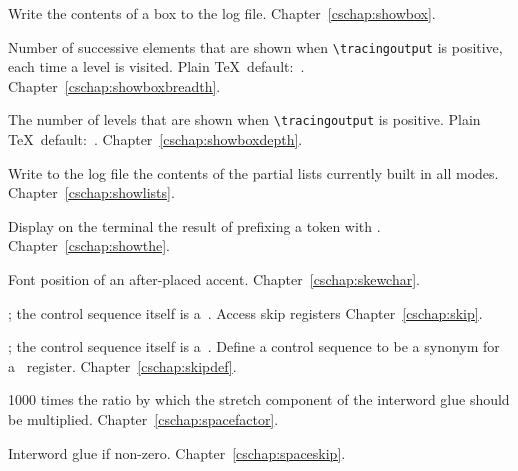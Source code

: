 \begin{glossinventory}
\item [\cs{showbox\gr{8-bit number}}]
      Write the contents of a box to the log file.
Chapter~\ref{cschap:showbox}.

\item [\cs{showboxbreadth}]
      Number of successive elements that are shown when 
      \verb-\tracingoutput- is positive, each time a level is visited.
      Plain \TeX\ default:~.
Chapter~\ref{cschap:showboxbreadth}.

\item [\cs{showboxdepth}] 
      The number of levels that are shown when 
      \verb-\tracingoutput- is positive.
      Plain \TeX\ default:~.
Chapter~\ref{cschap:showboxdepth}.

\item [\cs{showlists}]
      Write to the log file the contents of the partial lists 
      currently built in all modes.
Chapter~\ref{cschap:showlists}.

\item [\cs{showthe\gr{internal quantity}}]
      Display on the terminal the result 
      of prefixing a token with .
Chapter~\ref{cschap:showthe}.

\item [\cs{skewchar\gr{font}}]
      Font position of an after-placed accent.
     Chapter~\ref{cschap:skewchar}.
 
\item [\cs{skip\gr{8-bit number}}]
      ; the control sequence itself
      is a~.
      Access skip registers
Chapter~\ref{cschap:skip}.

\item [\cs{skipdef\gr{control sequence}\gr{equals}\gr{8-bit number}}]
      ; the control sequence
      itself is a~.
      Define a control sequence to be a synonym for
      a~ register.
Chapter~\ref{cschap:skipdef}.

\item [\cs{spacefactor}]
      1000 times the ratio by which the stretch component of the
      interword glue should be multiplied.
Chapter~\ref{cschap:spacefactor}.

\item [\cs{spaceskip}]
      Interword glue if non-zero.
Chapter~\ref{cschap:spaceskip}.


\end{glossinventory}
